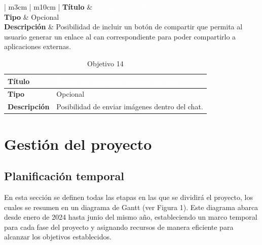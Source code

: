 \documentclass[a4paper, 12pt]{article}
\begin{document}
\begin{table}[H]
	\captionsetup{width=0.95\linewidth}%
   	\captionsetup{singlelinecheck=false}%
	\captionsetup{list=no}%
	\captionsetup{font=bf}
	\captionsetup{labelformat=empty}
	\caption{Objetivo 13}
	\begin{tabular}{ | m{3cm} | m{10cm} | }
		\hline {}\textbf{Título} &  \textcolor{white}{\textit{Compartición de caninos a través de un enlace}}  \\ \hline
		\textbf{Tipo} & Opcional \\ \hline
		\textbf{Descripción} & Posibilidad de incluir un botón de compartir que permita al usuario generar un enlace al can correspondiente para poder compartirlo a aplicaciones externas. \\ \hline
	\end{tabular}
\end{table}  

\begin{table}[H]
	\captionsetup{width=0.95\linewidth}%
   	\captionsetup{singlelinecheck=false}%
	\captionsetup{list=no}%
	\captionsetup{font=bf}
	\captionsetup{labelformat=empty}
	\caption{Objetivo 14}
	\begin{tabular}{ | m{3cm} | m{10cm} | }
		\hline \cellcolor{lightgray}\textbf{Título} & \cellcolor{gray} \textcolor{white}{\textit{Envío de imágenes dentro del chat}}  \\ \hline
		\cellcolor{lightgray}\textbf{Tipo} & Opcional \\ \hline
		\cellcolor{lightgray}\textbf{Descripción} & Posibilidad de enviar imágenes dentro del chat. \\ \hline
	\end{tabular}
\end{table} 

\newpage
\section{Gestión del proyecto}
\subsection{Planificación temporal}
En esta sección se definen todas las etapas en las que se dividirá el proyecto, los cuales se resumen en un diagrama de Gantt (ver Figura 1). Este diagrama abarca desde enero de 2024 hasta junio del mismo año, estableciendo un marco temporal para cada fase del proyecto y asignando recursos de manera eficiente para alcanzar los objetivos establecidos.
\end{document}
